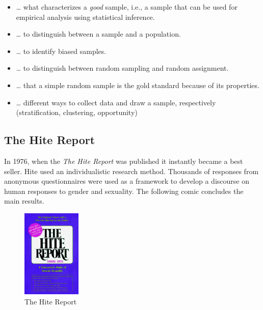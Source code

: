\documentclass[
  12pt,
  oneside]{book}
\providecommand{\tightlist}{%
  \setlength{\itemsep}{0pt}\setlength{\parskip}{0pt}}
\theoremstyle{definition}
\theoremstyle{definition}
\theoremstyle{definition}
\theoremstyle{definition}
\theoremstyle{remark}
\begin{document}
\begin{itemize}
\tightlist
\item
  \ldots{} what characterizes a \emph{good} sample, i.e., a sample that can be used for empirical analysis using statistical inference.
\item
  \ldots{} to distinguish between a sample and a population.
\item
  \ldots{} to identify biased samples.
\item
  \ldots{} to distinguish between random sampling and random assignment.
\item
  \ldots{} that a simple random sample is the gold standard because of its properties.
\item
  \ldots{} different ways to collect data and draw a sample, respectively (stratification, clustering, opportunity)
\end{itemize}

\hypertarget{the-hite-report}{%
\subsection{The Hite Report}\label{the-hite-report}}

In 1976, when the \emph{The Hite Report} \citep[see][]{Hite1976Hite} was published it instantly became a best seller.
Hite used an individualistic research method. Thousands of responses from anonymous questionnaires were used as a framework to develop a discourse on human responses to gender and sexuality. The following comic concludes the main results.

\begin{figure}
\centering
\includegraphics[width=0.25\textwidth,height=\textheight]{fig/hite.jpeg}
\caption{\label{fig:hitereport} The Hite Report}
\end{figure}
\end{document}
